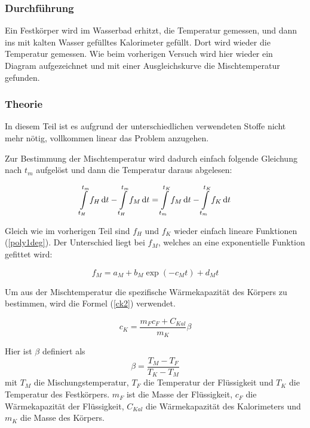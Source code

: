 \documentclass[11pt,a4paper]{article}
\newcommand\dif{\mathop{}\!\mathrm{d}}
\begin{document}
\subsubsection{Durchf\"uhrung}

Ein Festk\"orper wird im Wasserbad erhitzt, die Temperatur gemessen, und dann ins mit kalten Wasser gef\"ulltes Kalorimeter gef\"ullt. Dort wird wieder die Temperatur gemessen. Wie beim vorherigen Versuch wird hier wieder ein Diagram aufgezeichnet und mit einer Ausgleichskurve die Mischtemperatur gefunden. 

\subsubsection{Theorie}

In diesem Teil ist es aufgrund der unterschiedlichen verwendeten Stoffe nicht mehr n\"otig, vollkommen linear das Problem anzugehen.

Zur Bestimmung der Mischtemperatur wird dadurch einfach folgende Gleichung nach $t_m$ aufgel\"ost und dann die Temperatur daraus abgelesen:

\begin{equation}
\int\displaylimits_{t_H}^{t_m}f_H\dif t-\int\displaylimits_{t_H}^{t_m}f_M\dif t=\int\displaylimits_{t_m}^{t_K}f_M\dif t-\int\displaylimits_{t_m}^{t_K}f_K\dif t\label{bigint2}
\end{equation}

Gleich wie im vorherigen Teil sind $f_H$ und $f_K$ wieder einfach lineare Funktionen (\ref{poly1deg}). Der Unterschied liegt bei $f_M$, welches an eine exponentielle Funktion gefittet wird:

\begin{equation}
f_M=a_M+b_M\exp({-c_Mt})+d_Mt\label{efunc1}
\end{equation}

Um aus der Mischtemperatur die spezifische W\"armekapazit\"at des K\"orpers zu bestimmen, wird die Formel (\ref{ck2}) verwendet.

\begin{equation}
c_K=\frac{m_Fc_F+C_{Kal}}{m_K}\beta\label{ck2}
\end{equation}

Hier ist $\beta$ definiert als
\[
\beta=\frac{T_M-T_F}{T_K-T_M}
\]
mit $T_M$ die Mischungstemperatur, $T_F$ die Temperatur der Fl\"ussigkeit und $T_K$ die Temperatur des Festk\"orpers. $m_F$ ist die Masse der Fl\"ussigkeit, $c_F$ die W\"armekapazit\"at der Fl\"ussigkeit, $C_{Kal}$ die W\"armekapazit\"at des Kalorimeters und $m_K$ die Masse des K\"orpers.
\end{document}
